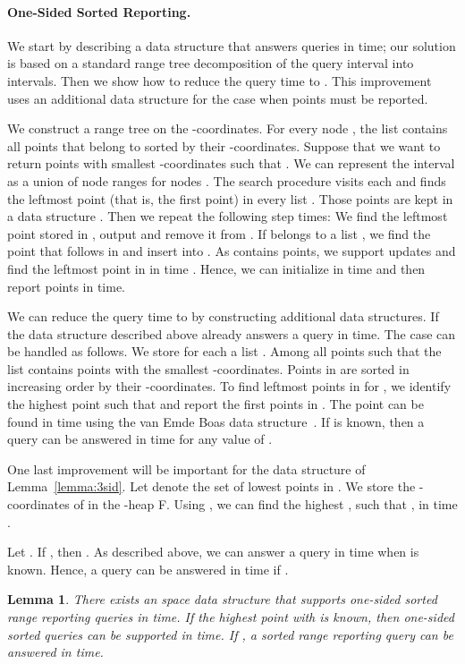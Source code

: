 \documentclass[11pt]{article}
\newcommand{\no}[1]{}
\newtheorem{lemma}{Lemma}
\begin{document}
\paragraph{One-Sided Sorted Reporting.} We start by describing a data
structure that answers queries in  time; our solution is  based on a standard range tree
 decomposition of the query interval  into  intervals. Then we show how
to reduce the query time to . This improvement uses an additional data structure 
for the case when  points must be reported. 

We construct a range tree on the
-coordinates. For every node , the list  contains all
points that belong to  sorted by their -coordinates. Suppose
that we want to return  points  with smallest -coordinates
such that .  We can represent the interval  as a
union of  node ranges for nodes .  The search
procedure visits each  and finds the leftmost point (that is, the
first point) in every list .  Those points are kept in a data
structure . Then we repeat the following step  times: We find the 
leftmost point  stored in , output  and remove it from
. If  belongs to a list , we find the point  that
follows  in  and insert  into .  As  contains
 points, we support updates and find the leftmost point
in  in  time \cite{FW94}.  Hence, we can initialize  in
 time and then report  points in  time.


We can reduce the query time to  by constructing additional data
structures.  If  the data structure described above
already answers a query in  time.  The case  can be handled as follows.  We store for each  a list
. Among all points  such that  the list
 contains  points with the smallest
-coordinates. Points in  are sorted in increasing order by
their -coordinates.  To find  leftmost points in  for , we identify the highest point  such that  and report the first  points in . The point  can be
found in  time using the van Emde Boas data structure~\cite{BoasKZ77}.  If  is known, then a query can be answered in  time for any 
value of .

One last improvement will be important for the data structure of Lemma~\ref{lemma:3sid}. Let  denote the set of  lowest points in . We store the -coordinates of 
in the -heap F. Using , we can find the highest , 
such that , in  time \cite{FW94}. 
\no{Suppose that we want to report  leftmost points , , in sorted order.}   
Let . If , 
then . As described above, we can answer a query in  time 
when  is known. Hence, a query can be answered in  time if .
\no{If , then we can answer a query in  time.} 
\begin{lemma}\label{lemma:1sid}
  There exists an  space data structure that supports
  one-sided sorted range 
  reporting queries in  time. If the highest point
   with  is known, then one-sided sorted queries can be
  supported in  time. 
  If , a sorted range 
  reporting query  can be answered in  time.
\no{If , then  one-sided  sorted  queries  can be answered in  time.}
\no{ where .}
\end{lemma}
\end{document}
